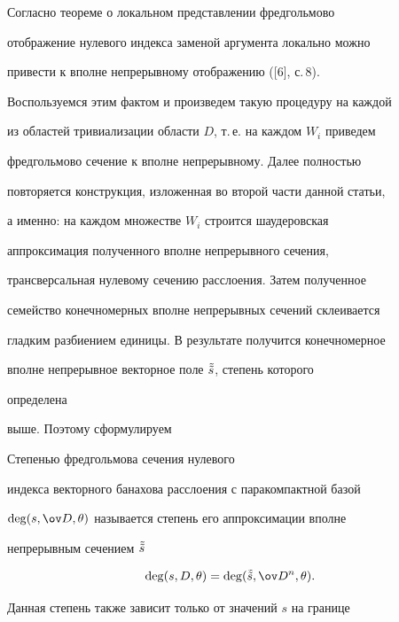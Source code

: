  


Согласно теореме о локальном представлении фредгольмово 


отображение нулевого индекса заменой аргумента локально можно 


привести к вполне непрерывному отображению ([6], с.\,8). 


 


Воспользуемся этим фактом и произведем такую процедуру на каждой 


из областей тривиализации области $D$, т.\,е. на каждом $W_i$ приведем 


фредгольмово сечение к вполне непрерывному. Далее полностью 


повторяется конструкция, изложенная во второй части данной статьи, 


а именно: на каждом множестве $W_i$ строится шаудеровская 


аппроксимация полученного вполне непрерывного сечения, 


трансверсальная нулевому сечению расслоения. Затем полученное 


семейство конечномерных вполне непрерывных сечений склеивается 


гладким разбиением единицы. В результате получится конечномерное 


вполне непрерывное векторное поле $\Tilde{\Tilde s}$, степень которого 


определена 


выше. Поэтому сформулируем 


 


\begin{defn} 


Степенью фредгольмова сечения нулевого 


индекса векторного банахова расслоения с паракомпактной базой 


$\deg(s,\ov D,\theta)$ называется степень его аппроксимации вполне 


непрерывным сечением $\Tilde{\Tilde s}$ 


$$ 


\deg(s, D,\theta)=\deg(\Tilde{\Tilde s},\ov D{}^n,\theta). 


$$ 


\end{defn} 


 


 


Данная степень также зависит только от значений $s$ на границе 


